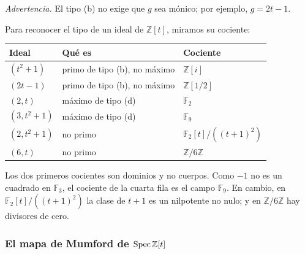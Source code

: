 \emph{Advertencia.} El tipo (b) no exige que $g$ sea mónico; por ejemplo, $g=2t-1$.

\begin{obs}[Ejemplos]
\label{obs:s08-ejemplos-primos-z-t}
Para reconocer el tipo de un ideal de $\mathbb Z[t]$, miramos su cociente:
\begin{center}
\small
\renewcommand{\arraystretch}{1.25}
\begin{tabular}{lll}
\hline
Ideal & Qué es & Cociente\\
\hline
$(t^2+1)$ & primo de tipo (b), no máximo & $\mathbb Z[i]$\\
$(2t-1)$ & primo de tipo (b), no máximo & $\mathbb Z[1/2]$\\
$(2,t)$ & máximo de tipo (d) & $\mathbb F_2$\\
$(3,t^2+1)$ & máximo de tipo (d) & $\mathbb F_9$\\
$(2,t^2+1)$ & no primo & $\mathbb F_2[t]/((t+1)^2)$\\
$(6,t)$ & no primo & $\mathbb Z/6\mathbb Z$\\
\hline
\end{tabular}
\end{center}
Los dos primeros cocientes son dominios y no cuerpos. Como $-1$ no es un cuadrado en $\mathbb F_3$, el cociente de la cuarta fila es el campo $\mathbb F_9$. En cambio, en $\mathbb F_2[t]/((t+1)^2)$ la clase de $t+1$ es un nilpotente no nulo; y en $\mathbb Z/6\mathbb Z$ hay divisores de cero.
\end{obs}

\subsubsection{El mapa de Mumford de \texorpdfstring{$\operatorname{Spec}\mathbb Z[t]$}{Spec Z[t]}}

